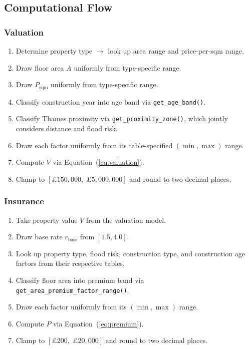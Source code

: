 \documentclass[11pt,a4paper]{article}
\begin{document}
\subsection{Computational Flow}

\subsubsection{Valuation}

\begin{enumerate}
    \item Determine property type $\rightarrow$ look up area range and
          price-per-sqm range.
    \item Draw floor area $A$ uniformly from type-specific range.
    \item Draw $P_{\mathrm{sqm}}$ uniformly from type-specific range.
    \item Classify construction year into age band via
          \texttt{get\_age\_band()}.
    \item Classify Thames proximity via \texttt{get\_proximity\_zone()},
          which jointly considers distance and flood risk.
    \item Draw each factor uniformly from its table-specified $(\min, \max)$
          range.
    \item Compute $V$ via Equation~(\ref{eq:valuation}).
    \item Clamp to $[\pounds150{,}000,\;\pounds5{,}000{,}000]$ and round
          to two decimal places.
\end{enumerate}

\subsubsection{Insurance}

\begin{enumerate}
    \item Take property value $V$ from the valuation model.
    \item Draw base rate $r_{\mathrm{base}}$ from $[1.5, 4.0]$.
    \item Look up property type, flood risk, construction type, and
          construction age factors from their respective tables.
    \item Classify floor area into premium band via
          \texttt{get\_area\_premium\_factor\_range()}.
    \item Draw each factor uniformly from its $(\min, \max)$ range.
    \item Compute $P$ via Equation~(\ref{eq:premium}).
    \item Clamp to $[\pounds200,\;\pounds20{,}000]$ and round to two
          decimal places.
\end{enumerate}
\end{document}
